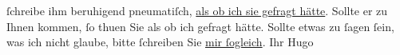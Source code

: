 \begin{ledgroupsized}[t]{13cm}
                    ſchreibe ihm beruhigend pneumatiſch, \uline{als ob ich sie
                        gefragt hätte}. Sollte er zu Ihnen kommen, ſo thuen Sie als ob ich
                    gefragt hätte. Sollte etwas zu ſagen ſein, was ich nicht glaube, bitte ſchreiben
                    Sie \uline{mir ſogleich}.\pend
           \pstart Ihr \spacefill\mbox{Hugo}\pend{}          \endnumbering{}\end{ledgroupsized}  \newcommand{\dateiname}{L00769}\newcommand{\titel}{Hugo von Hofmannsthal an Arthur Schnitzler, 25. 1. 1898}\newcommand{\editorInnen}{Martin Anton Müller und Gerd-Hermann Susen}
            \footnotesize
\begin{ledgroupsized}[t]{11.5cm}
\end{ledgroupsized}
         
      